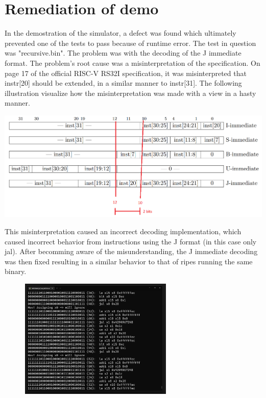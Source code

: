 \section{Remediation of demo}

In the demostration of the simulator, a defect was found which ultimately prevented one of the tests to pass because of runtime error.
The test in question was "recursive.bin". The problem was with the decoding of the J immediate format.
The problem's root cause was a misinterpretation of the specification. 
On page 17 of the official RISC-V RS32I specification, it was misinterpreted that instr[20] should be extended, in a similar manner to instr[31].
The following illustration visualize how the misinterpretation was made with a view in a hasty manner.
\begin{center}
\includegraphics[width=1\textwidth]{images/immediate.png}
\end{center}



This misinterpretation caused an incorrect decoding implementation, which caused incorrect behavior from instructions using the J format (in this case only jal).
After becomming aware of the misunderstanding, the J immediate decoding was then fixed resulting in a similar behavior to that of ripes running the same binary.

\begin{figure}
    \centering
    \includegraphics[width=0.65\textwidth]{images/loop.png}
\end{figure}

